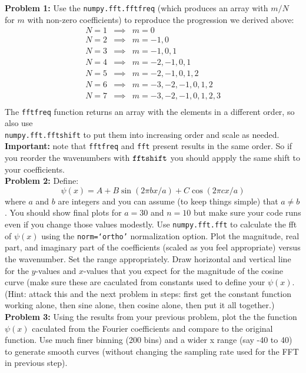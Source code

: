 \documentclass[12pt]{article}
\begin{document}
\noindent
{\bf Problem 1:} Use the {\tt numpy.fft.fftfreq} (which produces an array with $m/N$ for $m$ with non-zero coefficients) to reproduce the progression we derived above:
\begin{eqnarray*}
N=1 &\implies& m=0 \\
N=2 &\implies& m=-1,0 \\
N=3 &\implies& m=-1,0,1 \\
N=4 &\implies& m=-2,-1,0,1 \\
N=5 &\implies& m=-2,-1,0,1,2 \\
N=6 &\implies& m=-3,-2,-1,0,1,2 \\
N=7 &\implies& m=-3,-2,-1,0,1,2,3 \\
\end{eqnarray*}
The {\tt fftfreq} function returns an array with the elements in a different order, so also use \\
{\tt numpy.fft.fftshift} to put them into increasing order and scale as needed.
{\bf Important:} note that {\tt fftfreq} and {\tt fft} present results in the same order.  So if you reorder the wavenumbers with $\tt fftshift$ you should appply the same shift to your coefficients.\\[3pt]

\noindent
{\bf Problem 2:}  Define:
$$\psi(x) = A + B \sin(2\pi b x/a) + C \cos(2\pi c x/a)$$
where $a$ and $b$ are integers and you can
assume (to keep things simple) that $a \neq b$.  You should show final
plots for $a=30$ and $n=10$ but make sure your code runs even if you
change those values modestly.  Use {\tt numpy.fft.fft} to calculate
the fft of $\psi(x)$ using the {\tt norm=`ortho'} normalization
option.  Plot the magnitude, real part, and imaginary part of the
coefficients (scaled as you feel appropriate) versus the wavenumber.
Set the range appropriately.  Draw horizontal and vertical line for
the $y$-values and $x$-values that you expect for the magnitude of the cosine curve (make sure these are caculated from constants used to define your $\psi(x)$.  (Hint:  attack this and the next problem in steps:  first get the constant function working alone, then sine alone, then cosine alone, then put it all together.)\\[3pt]

\noindent
{\bf Problem 3:}  Using the results from your previous problem, plot the the function $\psi(x)$ caculated from the Fourier coefficients and compare to the original function. Use much finer binning (200 bins) and a wider x range (say -40 to 40) to generate smooth curves (without changing the sampling rate used for the FFT in previous step).\\[3pt]
\end{document}
